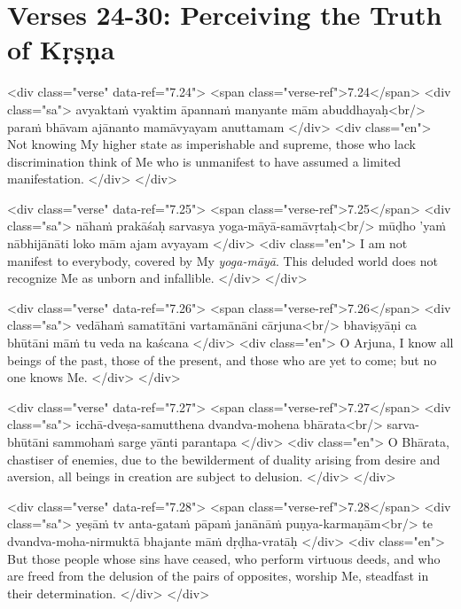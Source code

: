 \section{Verses 24-30: Perceiving the Truth of Kṛṣṇa}\label{sec-verses-24-30-perceiving-the-truth-of-krsna}


\begin{html}
<div class="verse" data-ref="7.24">
  <span class="verse-ref">7.24</span>
  <div class="sa">
    avyaktaṁ vyaktim āpannaṁ manyante mām abuddhayaḥ<br/>
    paraṁ bhāvam ajānanto mamāvyayam anuttamam
  </div>
  <div class="en">
    Not knowing My higher state as imperishable and supreme, those who lack discrimination think of Me who is unmanifest to have assumed a limited manifestation.
  </div>
</div>
\end{html}



\begin{html}
<div class="verse" data-ref="7.25">
  <span class="verse-ref">7.25</span>
  <div class="sa">
    nāhaṁ prakāśaḥ sarvasya yoga-māyā-samāvṛtaḥ<br/>
    mūḍho ’yaṁ nābhijānāti loko mām ajam avyayam
  </div>
  <div class="en">
    I am not manifest to everybody, covered by My \textit{yoga-māyā}. This deluded world does not recognize Me as unborn and infallible.
  </div>
</div>
\end{html}



\begin{html}
<div class="verse" data-ref="7.26">
  <span class="verse-ref">7.26</span>
  <div class="sa">
    vedāhaṁ samatītāni vartamānāni cārjuna<br/>
    bhaviṣyāṇi ca bhūtāni māṁ tu veda na kaścana
  </div>
  <div class="en">
    O Arjuna, I know all beings of the past, those of the present, and those who are yet to come; but no one knows Me.
  </div>
</div>
\end{html}



\begin{html}
<div class="verse" data-ref="7.27">
  <span class="verse-ref">7.27</span>
  <div class="sa">
    icchā-dveṣa-samutthena dvandva-mohena bhārata<br/>
    sarva-bhūtāni sammohaṁ sarge yānti parantapa
  </div>
  <div class="en">
    O Bhārata, chastiser of enemies, due to the bewilderment of duality arising from desire and aversion, all beings in creation are subject to delusion.
  </div>
</div>
\end{html}



\begin{html}
<div class="verse" data-ref="7.28">
  <span class="verse-ref">7.28</span>
  <div class="sa">
    yeṣāṁ tv anta-gataṁ pāpaṁ janānāṁ puṇya-karmaṇām<br/>
    te dvandva-moha-nirmuktā bhajante māṁ dṛḍha-vratāḥ
  </div>
  <div class="en">
    But those people whose sins have ceased, who perform virtuous deeds, and who are freed from the delusion of the pairs of opposites, worship Me, steadfast in their determination.
  </div>
</div>
\end{html}



